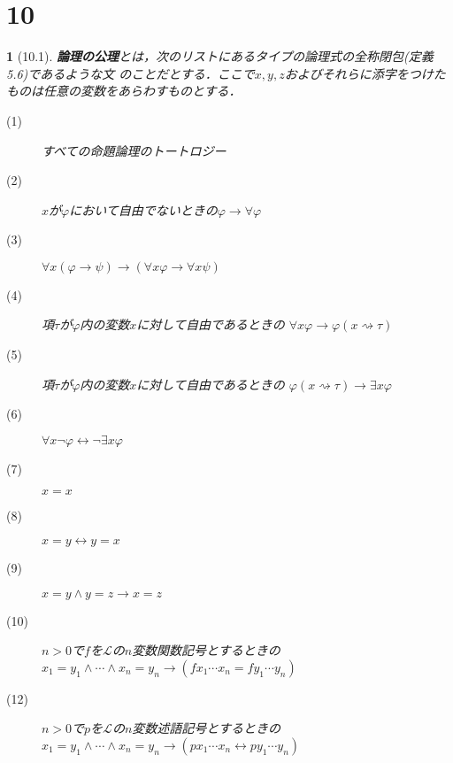\documentclass[a4j,10.5pt,oneside,openany]{jsbook}
\theoremstyle{mystyle}
\newtheorem{dfn}[thm]{\color{PakistanGreen}{定義}}
\begin{document}
\section{10}
	\begin{screen}
		\begin{dfn}[10.1]
			{\bf 論理の公理}とは，次のリストにあるタイプの論理式の全称閉包(定義5.6)であるような文
			のことだとする．ここで$x,y,z$およびそれらに添字をつけたものは任意の変数をあらわすものとする．
			\begin{description}
				\item[(1)] すべての命題論理のトートロジー
				\item[(2)] $x$が$\varphi$において自由でないときの$\varphi \rightarrow \forall \varphi$
				\item[(3)] $\forall x(\varphi \rightarrow \psi) \rightarrow
					(\forall x \varphi \rightarrow \forall x \psi)$
				\item[(4)] 項$\tau$が$\varphi$内の変数$x$に対して自由であるときの
					$\forall x \varphi \rightarrow \varphi(x \rightsquigarrow \tau)$
				\item[(5)] 項$\tau$が$\varphi$内の変数$x$に対して自由であるときの
					$\varphi(x \rightsquigarrow \tau) \rightarrow \exists x \varphi$
				\item[(6)] $\forall x \neg \varphi \leftrightarrow \neg \exists x \varphi$
				\item[(7)] $x = x$
				\item[(8)] $x = y \leftrightarrow y = x$
				\item[(9)] $x = y \wedge y = z \rightarrow x = z$
				\item[(10)] $n > 0$で$f$を$\mathcal{L}$の$n$変数関数記号とするときの
					$x_{1} = y_{1} \wedge \cdots \wedge x_{n} = y_{n} \rightarrow
					\left(fx_{1} \cdots x_{n} = fy_{1} \cdots y_{n}\right)$
				\item[(12)] $n > 0$で$p$を$\mathcal{L}$の$n$変数述語記号とするときの
					$x_{1} = y_{1} \wedge \cdots \wedge x_{n} = y_{n} \rightarrow
					\left(p x_{1} \cdots x_{n} \leftrightarrow p y_{1} \cdots y_{n}\right)$
			\end{description}
		\end{dfn}
	\end{screen}
\end{document}
